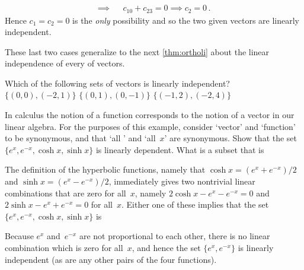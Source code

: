 \begin{example}
\begin{enumerate}[ref=\ref{eg:lindep}(\alph*)]
\begin{solution}
\begin{eqnarray*}
\\\implies&& c_10+c_23=0
\implies c_2=0\,.
\end{eqnarray*}
Hence \(c_1=c_2=0\) is the \emph{only} possibility and so the two given vectors are linearly independent.
\end{solution}

\end{enumerate}
These last two cases generalize to the next \cref{thm:ortholi} about the linear independence of every  of vectors.
\end{example}



\begin{activity}
Which of the following sets of vectors is linearly independent?
{\(\{(0,0),(-2,1)\}\)}
{\(\{(0,1),(0,-1)\}\)}
{\(\{(-1,2),(-2,4)\}\)}
\end{activity}




\begin{example} 
In calculus the notion of a function corresponds to the notion of a vector in our linear algebra.  
For the purposes of this example, consider `vector' and `function' to be synonymous, and that `all ' and `all~\(x\)' are synonymous. 
Show that the set \(\{e^x,e^{-x},\cosh x,\sinh x\}\) is linearly dependent.  
What is a subset that is 
\begin{solution} 
The definition of the hyperbolic functions, namely that \(\cosh x=(e^x+e^{-x})/2\) and \(\sinh x=(e^x-e^{-x})/2\), immediately gives two nontrivial linear combinations that are zero for all~\(x\), namely \(2\cosh x-e^x-e^{-x}=0\) and \(2\sinh x-e^x+e^{-x}=0\) for all~\(x\).
Either one of these implies that the set \(\{e^x,e^{-x},\cosh x,\sinh x\}\) is 

Because \(e^x\) and~\(e^{-x}\) are not proportional to each other, there is no linear combination which is zero for all~\(x\), and hence the set \(\{e^x,e^{-x}\}\) is linearly independent (as are any other pairs of the four functions).
\end{solution}
\end{example}







